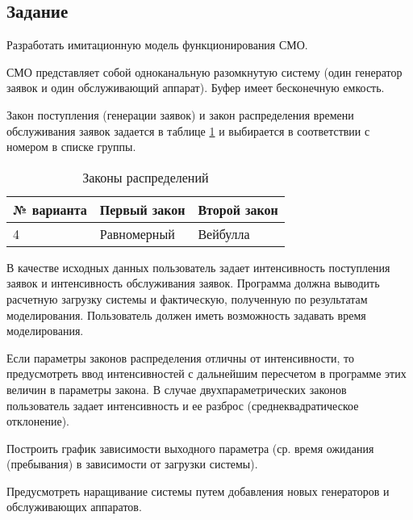 \documentclass[a4paper, 14pt]{extreport}
\begin{document}


\begin{MainPart}

\section{Задание}

Разработать имитационную модель функционирования СМО.

СМО представляет собой одноканальную разомкнутую систему (один генератор заявок и один обслуживающий аппарат). Буфер имеет бесконечную емкость.

Закон поступления (генерации заявок) и закон распределения времени обслуживания заявок задается в таблице \ref{tbl:distributions} и выбирается в соответствии с номером в списке группы.

\begin{table}[H]
	\centering
	\captionsetup{justification=centering}
	\caption{Законы распределений}
	\label{tbl:distributions}
	\begin{tabular}{|l|l|l|}
		\hline
		\multicolumn{1}{|c|}{\textbf{№ варианта}} & \multicolumn{1}{c|}{\textbf{Первый закон}} & \multicolumn{1}{c|}{\textbf{Второй закон}} \\ \hline
		4                                         & Равномерный                                & Вейбулла                                   \\ \hline
	\end{tabular}
\end{table}

В качестве исходных данных пользователь задает интенсивность поступления заявок и интенсивность обслуживания заявок.
Программа должна выводить расчетную загрузку системы и фактическую, полученную по результатам моделирования.
Пользователь должен иметь возможность задавать время моделирования.

Если параметры законов распределения отличны от интенсивности, то предусмотреть ввод интенсивностей с дальнейшим пересчетом в программе этих величин в параметры закона.
В случае двухпараметрических законов пользователь задает интенсивность и ее разброс (среднеквадратическое отклонение).

Построить график зависимости выходного параметра (ср. время ожидания (пребывания) в зависимости от загрузки системы).

Предусмотреть наращивание системы путем добавления новых генераторов и обслуживающих аппаратов.


\end{MainPart}
\end{document}
